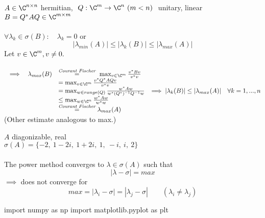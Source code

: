 
\begin{SolutionSheet}[\ref{sheet3}]
  \begin{onehalfspace}
    

  \begin{Solution} $A \in \C^{n\x n}$ hermitian, $ \ Q: \C^m \to \C^n \ (m<n) \ $ unitary, linear \\
    $B = Q^*AQ \in \C^{m \x m}$ \\
    \\
    \Claim $\forall\lambda_k \in\sigma(B): \quad \lambda_k =0$ or \begin{equation*}
        |\lambda_{min}(A)| \leq |\lambda_k (B)| \leq |\lambda_{max}(A)|
      \end{equation*}
    \Proof Let $v\in \C^m, v\neq 0.$ \\
    \\
    $\begin{array}{lll}
     \implies & \lambda_{max}(B) &\stackrel{\textit{Courant Fischer}}{=} \ \max_{v\in \C^m} \frac{v^*Bv}{v^*v} \\
      &&= \max_{v\in \C^m} \frac{v^*Q^*AQv}{v^*v} \\
      &&= \max_{w \in range(Q)} \frac{w^*Aw}{w^*(Q^*)^{-1}Q^{-1}w} \\
      && \leq \max_{w\in \C^n} \frac{w^*Aw}{w^*w} \\
      &&\stackrel{\textit{Courant Fischer}}{=} \lambda_{max}(A)
    \end{array}\\
    \\
    \implies |\lambda_k(B)| \leq |\lambda_{max}(A)| \quad \forall k = 1,...,n$\\
    (Other estimate analogous to max.)
  \end{Solution}

  \begin{Solution}
    $A$ diagonizable, real \\
    $\sigma(A) = \{-2, \ 1-2i, \ 1+2i, \ 1, \ -i, \ i, \ 2\}$ \\
    \\
    The power method converges to $\lambda\in \sigma(A)$ such that \begin{equation*}
      |\lambda - \sigma| = max
    \end{equation*} 
    $\implies $ does not converge for \begin{equation*}
      max = |\lambda_i -\sigma| = |\lambda_j - \sigma| \qquad (\lambda_i \neq \lambda_j)
    \end{equation*} 
    \begin{pycode}
      import numpy as np
      import matplotlib.pyplot as plt


\end{pycode}
\end{Solution}
\end{onehalfspace}
\end{SolutionSheet}
